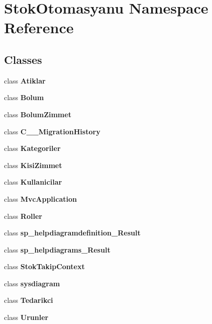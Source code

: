 \section{Stok\+Otomasyanu Namespace Reference}
\label{namespace_stok_otomasyanu}
\subsection*{Classes}
\begin{DoxyCompactItemize}
\item 
class \textbf{ Atiklar}
\item 
class \textbf{ Bolum}
\item 
class \textbf{ Bolum\+Zimmet}
\item 
class \textbf{ C\+\_\+\+\_\+\+Migration\+History}
\item 
class \textbf{ Kategoriler}
\item 
class \textbf{ Kisi\+Zimmet}
\item 
class \textbf{ Kullanicilar}
\item 
class \textbf{ Mvc\+Application}
\item 
class \textbf{ Roller}
\item 
class \textbf{ sp\+\_\+helpdiagramdefinition\+\_\+\+Result}
\item 
class \textbf{ sp\+\_\+helpdiagrams\+\_\+\+Result}
\item 
class \textbf{ Stok\+Takip\+Context}
\item 
class \textbf{ sysdiagram}
\item 
class \textbf{ Tedarikci}
\item 
class \textbf{ Urunler}
\end{DoxyCompactItemize}
